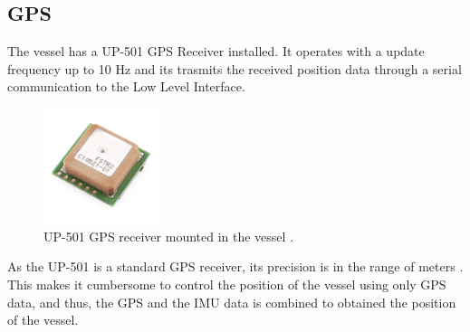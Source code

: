 \subsection{GPS}
The vessel has a UP-501 GPS Receiver installed. It operates with a update frequency up to 10 Hz and its trasmits the received position data through a serial communication to the Low Level Interface. \cite{GPS}
%
\begin{figure}[H]
	\includegraphics[width=0.3\textwidth]{figures/GPS}
	\caption{UP-501 GPS receiver mounted in the vessel \cite{GPS}.}
	\label{fig:GPS}
\end{figure}
%
As the UP-501 is a standard GPS receiver, its precision is in the range of meters . This makes it cumbersome to control the position of the vessel using only GPS data, and thus, the GPS and the IMU data is combined to obtained the position of the vessel.
%
%
%
%
